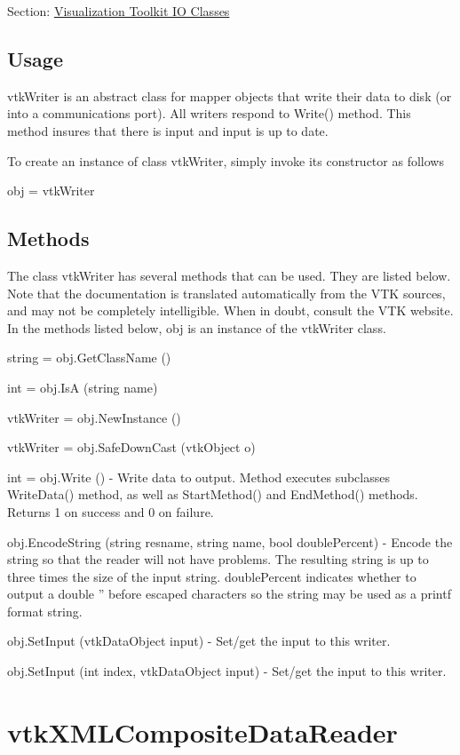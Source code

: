 Section\-: \hyperlink{sec_vtkio}{Visualization Toolkit I\-O Classes} \hypertarget{vtkwidgets_vtkxyplotwidget_Usage}{}\subsection{Usage}\label{vtkwidgets_vtkxyplotwidget_Usage}
vtk\-Writer is an abstract class for mapper objects that write their data to disk (or into a communications port). All writers respond to Write() method. This method insures that there is input and input is up to date.

To create an instance of class vtk\-Writer, simply invoke its constructor as follows \begin{DoxyVerb}  obj = vtkWriter
\end{DoxyVerb}
 \hypertarget{vtkwidgets_vtkxyplotwidget_Methods}{}\subsection{Methods}\label{vtkwidgets_vtkxyplotwidget_Methods}
The class vtk\-Writer has several methods that can be used. They are listed below. Note that the documentation is translated automatically from the V\-T\-K sources, and may not be completely intelligible. When in doubt, consult the V\-T\-K website. In the methods listed below, {\ttfamily obj} is an instance of the vtk\-Writer class. 
\begin{DoxyItemize}
\item {\ttfamily string = obj.\-Get\-Class\-Name ()}  
\item {\ttfamily int = obj.\-Is\-A (string name)}  
\item {\ttfamily vtk\-Writer = obj.\-New\-Instance ()}  
\item {\ttfamily vtk\-Writer = obj.\-Safe\-Down\-Cast (vtk\-Object o)}  
\item {\ttfamily int = obj.\-Write ()} -\/ Write data to output. Method executes subclasses Write\-Data() method, as well as Start\-Method() and End\-Method() methods. Returns 1 on success and 0 on failure.  
\item {\ttfamily obj.\-Encode\-String (string resname, string name, bool double\-Percent)} -\/ Encode the string so that the reader will not have problems. The resulting string is up to three times the size of the input string. double\-Percent indicates whether to output a double '' before escaped characters so the string may be used as a printf format string.  
\item {\ttfamily obj.\-Set\-Input (vtk\-Data\-Object input)} -\/ Set/get the input to this writer.  
\item {\ttfamily obj.\-Set\-Input (int index, vtk\-Data\-Object input)} -\/ Set/get the input to this writer.  
\end{DoxyItemize}\hypertarget{vtkio_vtkxmlcompositedatareader}{}\section{vtk\-X\-M\-L\-Composite\-Data\-Reader}\label{vtkio_vtkxmlcompositedatareader}
